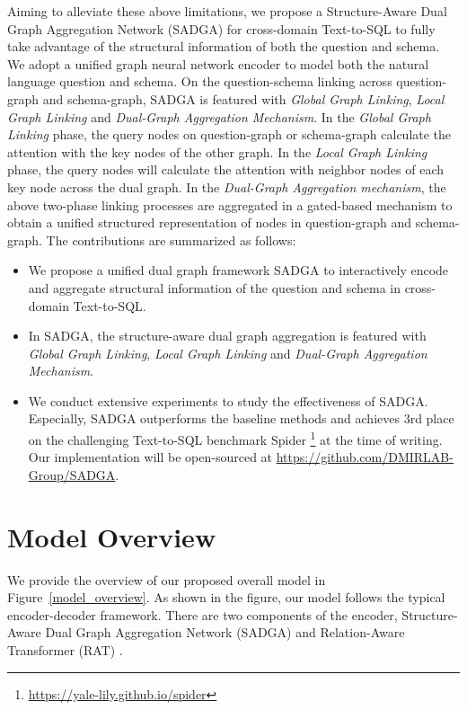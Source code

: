 \documentclass{article}
\begin{document}
Aiming to alleviate these above limitations, we propose a Structure-Aware Dual Graph Aggregation Network (SADGA) for cross-domain Text-to-SQL to fully take advantage of the structural information of both the question and schema. We adopt a unified graph neural network encoder to model both the natural language question and schema. On the question-schema linking across question-graph and schema-graph, SADGA is featured with \emph{Global Graph Linking}, \emph{Local Graph Linking} and \emph{Dual-Graph Aggregation Mechanism}. In the \emph{Global Graph Linking} phase, the query nodes on question-graph or schema-graph calculate the attention with the key nodes of the other graph. In the \emph{Local Graph Linking} phase, the query nodes will calculate the attention with neighbor nodes of each key node across the dual graph. In the \emph{Dual-Graph Aggregation mechanism}, the above two-phase linking processes are aggregated in a gated-based mechanism to obtain a unified structured representation of nodes in question-graph and schema-graph. 
The contributions are summarized as follows:

\begin{itemize}
 \item We propose a unified dual graph framework SADGA to interactively encode and aggregate structural information of the question and schema in cross-domain Text-to-SQL.
 \item In SADGA, the structure-aware dual graph aggregation is featured with \emph{Global Graph Linking}, \emph{Local Graph Linking} and \emph{Dual-Graph Aggregation Mechanism}.
 \item We conduct extensive experiments to study the effectiveness of SADGA. Especially, SADGA outperforms the baseline methods and achieves 3rd place on the challenging Text-to-SQL benchmark Spider \footnote {\url{https://yale-lily.github.io/spider}} \citep{yu2018spider} at the time of writing. Our implementation will be open-sourced at \url{https://github.com/DMIRLAB-Group/SADGA}.
\end{itemize}


\section{Model Overview}
We provide the overview of our proposed overall model in Figure~\ref{model_overview}. As shown in the figure, our model follows the typical encoder-decoder framework.
There are two components of the encoder, Structure-Aware Dual Graph Aggregation Network (SADGA) and Relation-Aware Transformer (RAT) \citep{wang2020rat}. 
\end{document}
